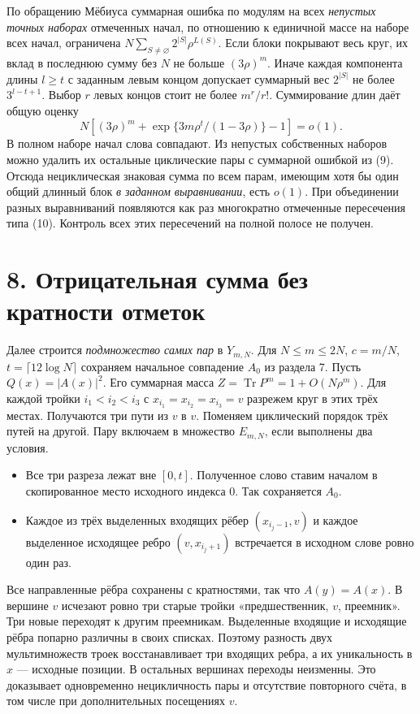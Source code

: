 \documentclass[11pt,a4paper]{article}
\newcommand{\Tr}{\operatorname{Tr}}
\newcommand{\sect}[1]{\section*{\sffamily\color{ink}#1}}
\begin{document}
По обращению Мёбиуса суммарная ошибка по модулям на всех \emph{непустых точных наборах} отмеченных начал, по отношению к единичной массе на наборе всех начал, ограничена $N\sum_{S\ne\varnothing}2^{|S|}\rho^{L(S)}$. Если блоки покрывают весь круг, их вклад в последнюю сумму без $N$ не больше $(3\rho)^m$. Иначе каждая компонента длины $l\ge t$ с заданным левым концом допускает суммарный вес $2^{|S|}$ не более $3^{l-t+1}$. Выбор $r$ левых концов стоит не более $m^r/r!$. Суммирование длин даёт общую оценку
\[
 N\left[(3\rho)^m+
 \exp\{3m\rho^t/(1-3\rho)\}-1\right]=o(1).
\]
В полном наборе начал слова совпадают. Из непустых собственных наборов можно удалить их остальные циклические пары с суммарной ошибкой из (9). Отсюда нециклическая знаковая сумма по всем парам, имеющим хотя бы один общий длинный блок \emph{в заданном выравнивании}, есть $o(1)$. При объединении разных выравниваний появляются как раз многократно отмеченные пересечения типа (10). Контроль всех этих пересечений на полной полосе не получен.
\newpage
\sect{8. Отрицательная сумма без кратности отметок}
Далее строится \emph{подмножество самих пар} в $Y_{m,N}$. Для $N\le m\le2N$, $c=m/N$, $t=\lceil12\log N\rceil$ сохраняем начальное совпадение $A_0$ из раздела 7. Пусть $Q(x)=|A(x)|^2$. Его суммарная масса $Z=\Tr P^m=1+O(N\rho^m)$. Для каждой тройки $i_1<i_2<i_3$ с $x_{i_1}=x_{i_2}=x_{i_3}=v$ разрежем круг в этих трёх местах. Получаются три пути из $v$ в $v$. Поменяем циклический порядок трёх путей на другой. Пару включаем в множество $E_{m,N}$, если выполнены два условия.
\begin{itemize}
\item Все три разреза лежат вне $[0,t]$. Полученное слово ставим началом в скопированное место исходного индекса 0. Так сохраняется $A_0$.
\item Каждое из трёх выделенных входящих рёбер $(x_{i_j-1},v)$ и каждое выделенное исходящее ребро $(v,x_{i_j+1})$ встречается в исходном слове ровно один раз.
\end{itemize}
Все направленные рёбра сохранены с кратностями, так что $A(y)=A(x)$. В вершине $v$ исчезают ровно три старые тройки «предшественник, $v$, преемник». Три новые переходят к другим преемникам. Выделенные входящие и исходящие рёбра попарно различны в своих списках. Поэтому разность двух мультимножеств троек восстанавливает три входящих ребра, а их уникальность в $x$ --- исходные позиции. В остальных вершинах переходы неизменны. Это доказывает одновременно нецикличность пары и отсутствие повторного счёта, в том числе при дополнительных посещениях $v$.
\end{document}
